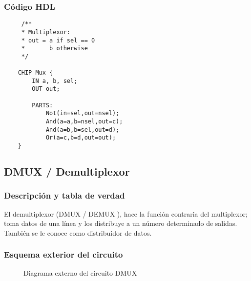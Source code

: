 \documentclass[12pt]{article}
\begin{document}
        \subsubsection{Código HDL}  

            \begin{lstlisting}
     /** 
     * Multiplexor:
     * out = a if sel == 0
     *       b otherwise
     */
    
    CHIP Mux {
        IN a, b, sel;
        OUT out;
    
        PARTS:
            Not(in=sel,out=nsel);
            And(a=a,b=nsel,out=c);
            And(a=b,b=sel,out=d);
            Or(a=c,b=d,out=out);
    }
            \end{lstlisting}

    \newpage
    \subsection{DMUX / Demultiplexor}
        \subsubsection{Descripción y tabla de verdad}
            El demultiplexor (DMUX / DEMUX \cite{floyd_fundamentos_2006}), hace la función contraria del multiplexor; toma datos de una línea y los distribuye a un número determinado de salidas. También se le conoce como distribuidor de datos. 

            \begin{table}[H]
            \centering
            \caption{Tabla de verdad de DMUX}
            \label{tab:dmux}
            \end{table}
        \subsubsection{Esquema exterior del circuito}
            \begin{figure}[H]
                \centering
                
                \caption{Diagrama externo del circuito DMUX} \cite{diagram}
                \label{fig:dmux_ext}
            \end{figure}
\end{document}
